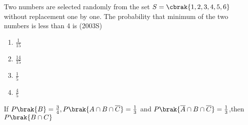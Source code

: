 
\iffalse
  \title{Assignment}
  \author{Pappuri Prahladha}
  \section{mcq-single}
\fi

    \item Two numbers are selected randomly from the set $S=\cbrak{1,2,3,4,5,6}$ without replacement one by one. The probability that minimum of the two numbers is less than 4 is   \hfill (2003S)
\begin{multicols}{4}
\begin{enumerate}
    \item $\frac{1}{15}$
    \item $\frac{14}{15}$
    \item $\frac{1}{5}$
    \item $\frac{4}{5}$
\end{enumerate}
\end{multicols}
\item If $P\brak{B}=\frac{3}{4},P\brak{A\cap B \cap \overline{C}}=\frac{1}{3}$ and $P\brak{\overline{A}\cap B\cap \overline{C}}=\frac{1}{3}$,then $P\brak{B\cap C}$ 


